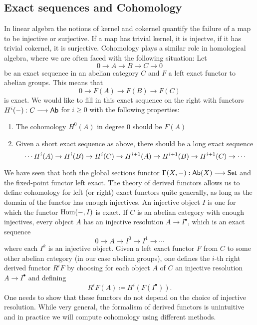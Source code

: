 \subsection{Exact sequences and Cohomology}
In linear algebra the notions of kernel and cokernel quantify the failure of a map to be injective or surjective. If a map has trivial kernel, it is injectve, if it has trivial cokernel, it is surjective. Cohomology plays a similar role in homological algebra, where we are often faced with the following situation:
Let
\[
	0 \to A \to B \to C \to 0
\]
be an exact sequence in an abelian category $C$ and $F$ a left exact functor to abelian groups. This means that
\[
	0 \to F(A) \to F(B) \to F(C)
\]
is exact. We  would like to fill in this exact sequence on the right with functors $H^i(-): C \longrightarrow \mathsf{Ab}$ for $i \ge 0$ with the following properties:
\begin{enumerate}
	\item The cohomology $H^0(A)$ in degree 0 should be $F(A)$
	\item Given a short exact sequence as above, there should be a long exact sequence
	      \[
		      \cdots H^i(A) \shortto H^i(B) \shortto H^i(C) \shortto H^{i+1}(A) \shortto H^{i+1}(B) \shortto H^{i+1}(C) \shortto \cdots
	      \]
\end{enumerate}

We have seen that both the global sections functor $\Gamma(X,-): \mathsf{Ab}(X) \longrightarrow \mathsf{Set}$ and the fixed-point functor left exact. The theory of derived functors allows us to define cohomology for left (or right) exact functors quite generally, as long as the domain of the functor has enough injectives. An injective object $I$ is one for which the functor $\operatorname{Hom}(-,I)$ is exact. If $C$ is an abelian category with enough injectives, every object $A$ has an injective resolution $A \to I^\bullet$, which is an exact sequence
\[
	0 \to A \to I^0 \to I^1 \to \cdots
\]
where each $I^k$ is an injective object. Given a left exact functor $F$ from $C$ to some other abelian category (in our case abelian groups), one defines the $i$-th right derived functor $R^i F$ by choosing for each object $A$ of $C$ an injective resolution $A \to I^\bullet$ and defining
\[
	R^i F(A) \coloneqq H^i(F(I^\bullet)).
\]
One needs to show that these functors do not depend on the choice of injective resolution. While very general, the formalism of derived functors is unintuitive and in practice we will compute cohomology using different methods.


